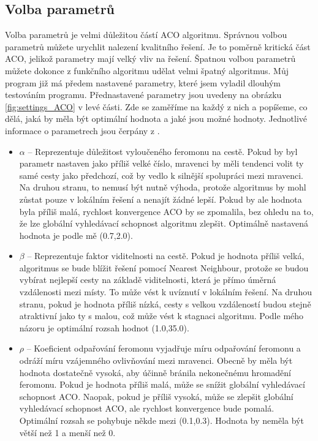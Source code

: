 \subsection{Volba parametrů}\label{sec:params}
Volba parametrů je velmi důležitou částí ACO algoritmu. Správnou volbou parametrů můžete urychlit nalezení kvalitního řešení. Je to poměrně kritická část ACO, jelikož parametry mají velký vliv na řešení. Špatnou volbou parametrů můžete dokonce z funkčního algoritmu udělat velmi špatný algoritmus. Můj program již má předem nastavené parametry, které jsem vyladil dlouhým testováním programu. Přednastavené parametry jsou uvedeny na obrázku \ref{fig:settings_ACO} v levé části. Zde se zaměříme na každý z nich a popíšeme, co dělá, jaká by měla být optimální hodnota a jaké jsou možné hodnoty.
Jednotlivé informace o parametrech jsou čerpány z \cite{Li2016}.
\begin{itemize}
    \item \textbf{$\alpha$} -- Reprezentuje důležitost vyloučeného feromonu na cestě. Pokud by byl parametr nastaven jako příliš velké číslo, mravenci by měli tendenci volit ty samé cesty jako předchozí, což by vedlo k silnější spolupráci mezi mravenci. Na druhou stranu, to nemusí být nutně výhoda, protože algoritmus by mohl zůstat pouze v lokálním řešení a nenajít žádné lepší. Pokud by ale hodnota byla příliš malá, rychlost konvergence ACO by se zpomalila, bez ohledu na to, že lze globální vyhledávací schopnost algoritmu zlepšit. Optimálně nastavená hodnota je podle mě (0.7,2.0).
    \item \textbf{$\beta$} -- Reprezentuje faktor viditelnosti na cestě. Pokud je hodnota příliš velká, algoritmus se bude blížit řešení pomocí Nearest Neighbour, protože se budou vybírat nejlepší cesty na základě viditelnosti, která je přímo úměrná vzdálenosti mezi místy. To může vést k uvíznutí v lokálním řešení. Na druhou stranu, pokud je hodnota příliš nízká, cesty s velkou vzdáleností budou stejně atraktivní jako ty s malou, což může vést k stagnaci algoritmu. Podle mého názoru je optimální rozsah hodnot (1.0,35.0).
    \item \textbf{$\rho$} --  Koeficient odpařování feromonu vyjadřuje míru odpařování feromonu a odráží míru vzájemného ovlivňování mezi mravenci. Obecně by měla být hodnota dostatečně vysoká, aby účinně bránila nekonečnému hromadění feromonu. Pokud je hodnota příliš malá, může se snížit globální vyhledávací schopnost ACO. Naopak, pokud je příliš vysoká, může se zlepšit globální vyhledávací schopnost ACO, ale rychlost konvergence bude pomalá. Optimální rozsah se pohybuje někde mezi (0.1,0.3). Hodnota by neměla být větší než 1 a menší než 0.

\end{itemize}
